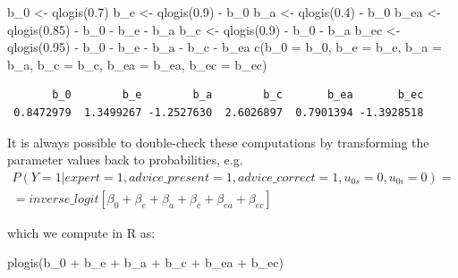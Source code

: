\documentclass[
  man,
  floatsintext,
  longtable,
  a4paper,
  nolmodern,
  notxfonts,
  notimes,
  colorlinks=true,linkcolor=blue,citecolor=blue,urlcolor=blue]{apa7}
\newenvironment{Shaded}{\begin{snugshade}}{\end{snugshade}}
\newcommand{\AttributeTok}[1]{\textcolor[rgb]{0.40,0.45,0.13}{#1}}
\newcommand{\FloatTok}[1]{\textcolor[rgb]{0.68,0.00,0.00}{#1}}
\newcommand{\FunctionTok}[1]{\textcolor[rgb]{0.28,0.35,0.67}{#1}}
\newcommand{\NormalTok}[1]{\textcolor[rgb]{0.00,0.23,0.31}{#1}}
\newcommand{\OtherTok}[1]{\textcolor[rgb]{0.00,0.23,0.31}{#1}}
\newcommand{\SpecialCharTok}[1]{\textcolor[rgb]{0.37,0.37,0.37}{#1}}
\begin{document}
\begin{Shaded}
\begin{Highlighting}[]
\NormalTok{b\_0 }\OtherTok{\textless{}{-}} \FunctionTok{qlogis}\NormalTok{(}\FloatTok{0.7}\NormalTok{)}
\NormalTok{b\_e }\OtherTok{\textless{}{-}} \FunctionTok{qlogis}\NormalTok{(}\FloatTok{0.9}\NormalTok{) }\SpecialCharTok{{-}}\NormalTok{ b\_0}
\NormalTok{b\_a }\OtherTok{\textless{}{-}} \FunctionTok{qlogis}\NormalTok{(}\FloatTok{0.4}\NormalTok{) }\SpecialCharTok{{-}}\NormalTok{ b\_0}
\NormalTok{b\_ea }\OtherTok{\textless{}{-}} \FunctionTok{qlogis}\NormalTok{(}\FloatTok{0.85}\NormalTok{) }\SpecialCharTok{{-}}\NormalTok{ b\_0 }\SpecialCharTok{{-}}\NormalTok{ b\_e }\SpecialCharTok{{-}}\NormalTok{ b\_a}
\NormalTok{b\_c }\OtherTok{\textless{}{-}} \FunctionTok{qlogis}\NormalTok{(}\FloatTok{0.9}\NormalTok{) }\SpecialCharTok{{-}}\NormalTok{ b\_0 }\SpecialCharTok{{-}}\NormalTok{ b\_a}
\NormalTok{b\_ec }\OtherTok{\textless{}{-}} \FunctionTok{qlogis}\NormalTok{(}\FloatTok{0.95}\NormalTok{) }\SpecialCharTok{{-}}\NormalTok{ b\_0 }\SpecialCharTok{{-}}\NormalTok{ b\_e }\SpecialCharTok{{-}}\NormalTok{ b\_a }\SpecialCharTok{{-}}\NormalTok{ b\_c }\SpecialCharTok{{-}}\NormalTok{ b\_ea}
\FunctionTok{c}\NormalTok{(}\AttributeTok{b\_0 =}\NormalTok{ b\_0, }\AttributeTok{b\_e =}\NormalTok{ b\_e, }\AttributeTok{b\_a =}\NormalTok{ b\_a, }\AttributeTok{b\_c =}\NormalTok{ b\_c, }\AttributeTok{b\_ea =}\NormalTok{ b\_ea, }\AttributeTok{b\_ec =}\NormalTok{ b\_ec)}
\end{Highlighting}
\end{Shaded}

\begin{verbatim}
       b_0        b_e        b_a        b_c       b_ea       b_ec 
 0.8472979  1.3499267 -1.2527630  2.6026897  0.7901394 -1.3928518 
\end{verbatim}

It is always possible to double-check these computations by transforming
the parameter values back to probabilities, e.g.~ \[
\begin{aligned}
P(Y=1|expert = 1, advice\_present = 1, advice\_correct = 1, u_{0s} = 0, u_{0i} = 0) = \\
= inverse\_logit[\beta_0 + \beta_e + \beta_a + \beta_c + \beta_{ea} + \beta_{ec}]
\end{aligned}
\]

which we compute in R as:

\begin{Shaded}
\begin{Highlighting}[]
\FunctionTok{plogis}\NormalTok{(b\_0 }\SpecialCharTok{+}\NormalTok{ b\_e }\SpecialCharTok{+}\NormalTok{ b\_a }\SpecialCharTok{+}\NormalTok{ b\_c }\SpecialCharTok{+}\NormalTok{ b\_ea }\SpecialCharTok{+}\NormalTok{ b\_ec)}
\end{Highlighting}
\end{Shaded}
\end{document}
